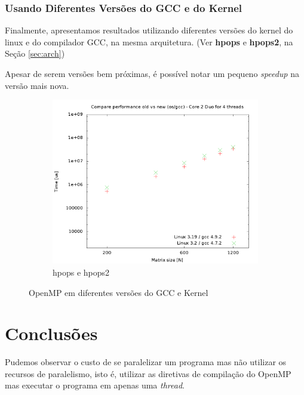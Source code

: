 \documentclass[a4paper, 12pt]{article}
\begin{document}
\subsubsection{Usando Diferentes Versões do GCC e do Kernel}

Finalmente, apresentamos resultados utilizando diferentes versões
do kernel do linux e do compilador GCC, na mesma arquitetura.
(Ver \textbf{hpops} e \textbf{hpops2}, na Seção \ref{sec:arch})

Apesar de serem versões bem próximas, é possível notar um pequeno
\textit{speedup} na versão mais nova.

\begin{figure}[H]
    \centering
    \begin{subfigure}[H]{0.5\textwidth}
        \includegraphics[width=\textwidth]{compare_old_new_os}
        \caption{hpops e hpops2}
        \label{fig:hpops_hpops2}
    \end{subfigure}%
    \caption{OpenMP em diferentes versões do GCC e Kernel}\label{fig:animals}
\end{figure}

\section{Conclusões} \label{sec:dis}

Pudemos observar o custo de se paralelizar um programa
mas não utilizar os recursos de paralelismo, isto é,
utilizar as diretivas de compilação do OpenMP mas
executar o programa em apenas uma \textit{thread}.



%
%
\end{document}
